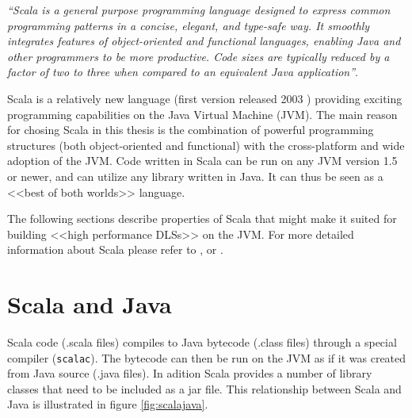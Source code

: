 \documentclass[a4paper,english]{report}
\begin{document}
\textit{``Scala is a general purpose programming language designed to
  express common programming patterns in a concise, elegant, and
  type-safe way. It smoothly integrates features of object-oriented
  and functional languages, enabling Java and other programmers to be
  more productive. Code sizes are typically reduced by a factor of two
  to three when compared to an equivalent Java
  application''}\cite{scala}.

Scala is a relatively new language (first version released 2003
\cite{scala}) providing exciting programming capabilities on the Java
Virtual Machine (JVM). The main reason for chosing Scala in this
thesis is the combination of powerful programming structures (both
object-oriented and functional) with the cross-platform and wide
adoption of the JVM. Code written in Scala can be run on any JVM
version 1.5 or newer, and can utilize any library written in Java. It
can thus be seen as a <<best of both worlds>> language.

The following sections describe properties of Scala that might make it
suited for building <<high performance DLSs>> on the JVM. For more
detailed information about Scala please refer to \cite{ode08},
\cite{scala} or \cite{scalatour}.

\section{Scala and Java}

Scala code (.scala files) compiles to Java bytecode (.class files)
through a special compiler (\texttt{scalac}). The bytecode can then be
run on the JVM as if it was created from Java source (.java files). In
adition Scala provides a number of library classes that need to be
included as a jar file. This relationship between Scala and Java is
illustrated in figure \vref{fig:scalajava}.
\end{document}
